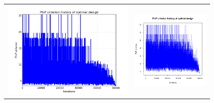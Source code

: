 \begin{figure}[!h]
\begin{center}
\begin{tabular}{>{\centering\arraybackslash}m{8cm}>{\centering\arraybackslash}m{8cm}}
 \includegraphics[scale=0.35]{crit_sa_lin.png}   & \includegraphics[scale=0.35]{dice_mindist_crit.png}\\

\end{tabular}
\end{center}
\end{figure}
